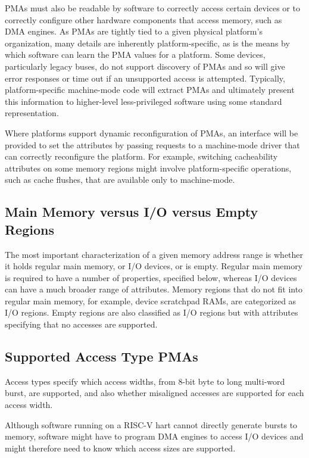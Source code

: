 PMAs must also be readable by software to correctly access certain
devices or to correctly configure other hardware components that
access memory, such as DMA engines.  As PMAs are tightly tied to a
given physical platform's organization, many details are inherently
platform-specific, as is the means by which software can learn the PMA
values for a platform.  Some
devices, particularly legacy buses, do not support discovery of PMAs
and so will give error responses or time out if an unsupported access
is attempted.  Typically, platform-specific machine-mode code will
extract PMAs and ultimately present this information to higher-level
less-privileged software using some standard representation.

Where platforms support dynamic reconfiguration of PMAs, an interface
will be provided to set the attributes by passing requests to a
machine-mode driver that can correctly reconfigure the platform.  For
example, switching cacheability attributes on some memory regions
might involve platform-specific operations, such as cache flushes,
that are available only to machine-mode.

\subsection{Main Memory versus I/O versus Empty Regions}

The most important characterization of a given memory address range is
whether it holds regular main memory, or I/O devices, or is empty.
Regular main memory is required to have a number of properties,
specified below, whereas I/O devices can have a much broader range of
attributes.  Memory regions that do not fit into regular main
memory, for example, device scratchpad RAMs, are categorized as I/O
regions.  Empty regions are also classified as I/O regions but with
attributes specifying that no accesses are supported.

\subsection{Supported Access Type PMAs}

Access types specify which access widths, from 8-bit byte to long
multi-word burst, are supported, and also whether misaligned accesses
are supported for each access width.

\begin{commentary}
Although software running on a RISC-V hart cannot directly generate
bursts to memory, software might have to program DMA engines to access
I/O devices and might therefore need to know which access sizes are
supported.
\end{commentary}


